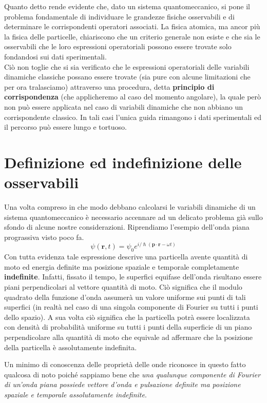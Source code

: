 Quanto detto rende evidente che, dato un sistema quantomeccanico, si
pone il problema fondamentale di individuare le grandezze fisiche
osservabili e di determinare le corrispondenti operatori associati.
La
fisica atomica, ma ancor più la fisica delle particelle, chiariscono che
un criterio generale non esiste e che sia le osservabili che le loro
espressioni operatoriali possono essere trovate solo fondandosi sui dati
sperimentali.\\
Ciò non toglie che si sia verificato che le espressioni operatoriali
delle variabili dinamiche classiche possano essere trovate (sia pure con
alcune limitazioni che per ora tralasciamo) attraverso una procedura,
detta \textbf{principio di corrispondenza} (che applicheremo al caso del
momento angolare), la quale però non può essere applicata nel caso di
variabili dinamiche che non abbiano un corrispondente classico.
In tali
casi l'unica guida rimangono i dati sperimentali ed il percorso può
essere lungo e tortuoso.

\section{Definizione ed indefinizione delle osservabili}\label{sec:definizione-ed-indefinizione-delle-osservabili}

Una volta compreso in che modo debbano calcolarsi le variabili dinamiche
di un sistema quantomeccanico è necessario accennare ad un delicato
problema già sullo sfondo di alcune nostre considerazioni.
Riprendiamo
l'esempio dell'onda piana prograssiva visto poco fa. \[
                                                         \psi(\bm{r},t) = \psi_{0}e^{ i/\hslash (\bm{p}\cdot \bm{r}- \omega t)}
\] Con tutta evidenza tale espressione descrive una particella avente
quantità di moto ed energia definite ma posizione spaziale e temporale
completamente \textbf{indefinite}.
Infatti, fissato il tempo, le
superfici equifase dell'onda risultano essere piani perpendicolari al
vettore quantità di moto.
Ciò significa che il modulo quadrato della
funzione d'onda assumerà un valore uniforme sui punti di tali superfici
(in realtà nel caso di una singola componente di Fourier su tutti i
punti dello spazio).
A sua volta ciò significa che la particella potrà
essere localizzata con densità di probabilità uniforme su tutti i punti
della superficie di un piano perpendicolare alla quantità di moto che
equivale ad affermare che la posizione della particella è assolutamente
indefinita.

Un minimo di conoscenza delle proprietà delle onde riconosce in questo
fatto qualcosa di noto poiché sappiamo bene che \emph{una qualunque
componente di Fourier di un'onda piana possiede vettore d'onda e
pulsazione definite ma posizione spaziale e temporale assolutamente
indefinite}.

